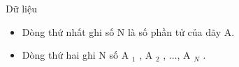 Dữ liệu
\begin{itemize}
	\item     Dòng thứ nhất ghi số N là số phần tử của dãy A.   
	\item     Dòng thứ hai ghi N số A    $_     1    $    , A    $_     2    $    , ...,  A    $_     N    $    .   
\end{itemize}